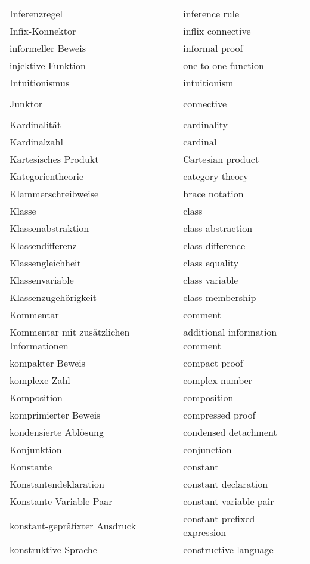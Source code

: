 \begin{longtabu}   { @{} X[l] X[l] }
    Inferenzregel & inference rule \\
    Infix-Konnektor & inflix connective \\
    informeller Beweis & informal proof \\
    injektive Funktion & one-to-one function \\
    Intuitionismus & intuitionism \\
     & \\
    Junktor & connective \\
     & \\       
    Kardinalität & cardinality \\
    Kardinalzahl & cardinal \\
    Kartesisches Produkt & Cartesian product \\
    Kategorientheorie & category theory \\
    Klammerschreibweise & brace notation \\
    Klasse & class \\
    Klassenabstraktion & class abstraction \\
    Klassendifferenz & class difference \\
    Klassengleichheit & class equality \\
    Klassenvariable & class variable \\
    Klassenzugehörigkeit & class membership \\
    Kommentar & comment \\
    \hangindent=0.5cm Kommentar mit zusätzlichen Informationen\vspace{3pt} & additional information comment \\
    kompakter Beweis & compact proof \\
    komplexe Zahl & complex number \\
    Komposition & composition \\
    komprimierter Beweis & compressed proof \\
    kondensierte Ablösung & condensed detachment \\
    Konjunktion & conjunction \\
    Konstante & constant \\
    Konstantendeklaration & constant declaration \\
    Konstante-Variable-Paar & constant-variable pair \\
    konstant-gepräfixter Ausdruck & constant-prefixed expression \\
    konstruktive Sprache & constructive language \\

\end{longtabu}
